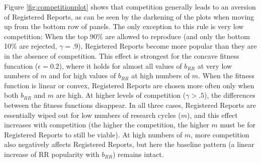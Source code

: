 \documentclass[
  ,man,mask,floatsintext]{apa6}
\begin{document}
Figure \ref{fig:competitionplot} shows that competition generally leads to an aversion of Registered Reports, as can be seen by the darkening of the plots when moving up from the bottom row of panels.
The only exception to this rule is very low competition:
When the top 90\% are allowed to reproduce (and only the bottom 10\% are rejected, \(\gamma = .9\)), Registered Reports become more popular than they are in the absence of competition.
This effect is strongest for the concave fitness funcation (\(\epsilon = 0.2\)), where it holds for almost all values of \(b_{RR}\) at very low numbers of \(m\) and for high values of \(b_{RR}\) at high numbers of \(m\).
When the fitness function is linear or convex, Registered Reports are chosen more often only when both \(b_{RR}\) and \(m\) are high.
At higher levels of competition (\(\gamma > .5\)), the differences between the fitness functions disappear.
In all three cases, Registered Reports are essentially wiped out for low numbers of research cycles (\(m\)), and this effect increases with competition (the higher the competition, the higher \(m\) must be for Registered Reports to still be viable).
At high numbers of \(m\), more competition also negatively affects Registered Reports, but here the baseline pattern (a linear increase of RR popularity with \(b_{RR}\)) remains intact.
\end{document}
